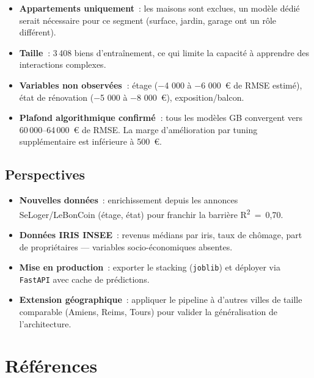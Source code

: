 \documentclass[12pt,a4paper]{article}
\begin{document}
\begin{itemize}
    \item \textbf{Appartements uniquement}~: les maisons sont exclues, un mod\`ele d\'edi\'e serait n\'ecessaire pour ce segment (surface, jardin, garage ont un r\^ole diff\'erent).
    \item \textbf{Taille~}: 3\,408 biens d'entra\^inement, ce qui limite la capacit\'e \`a apprendre des interactions complexes.
    \item \textbf{Variables non observ\'ees~}: \'etage ($-$4 000 \`a $-$6 000~\euro{} de RMSE estim\'e), \'etat de r\'enovation ($-$5 000 \`a $-$8 000~\euro), exposition/balcon.
    \item \textbf{Plafond algorithmique confirm\'e~}: tous les mod\`eles GB convergent vers 60\,000--64\,000~\euro{} de RMSE. La marge d'am\'elioration par tuning suppl\'ementaire est inf\'erieure \`a 500~\euro.
\end{itemize}

\subsection{Perspectives}

\begin{itemize}
    \item \textbf{Nouvelles donn\'ees}~: enrichissement depuis les annonces SeLoger/LeBonCoin (\'etage, \'etat) pour franchir la barri\`ere R\textsuperscript{2}~=~0{,}70.
    \item \textbf{Donn\'ees IRIS INSEE}~: revenus m\'edians par iris, taux de ch\^omage, part de propri\'etaires --- variables socio-\'economiques absentes.
    \item \textbf{Mise en production}~: exporter le stacking (\texttt{joblib}) et d\'eployer via \texttt{FastAPI} avec cache de pr\'edictions.
    \item \textbf{Extension g\'eographique}~: appliquer le pipeline \`a d'autres villes de taille comparable (Amiens, Reims, Tours) pour valider la g\'en\'eralisation de l'architecture.
\end{itemize}

\newpage
\section*{R\'ef\'erences}
\end{document}

